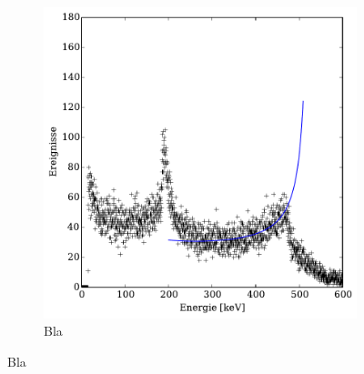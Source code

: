 \begin{figure}[htb]
\begin{subfigure}{0.49\linewidth}
        \includegraphics[width=1.0\linewidth]{img/06_caesium_zoomed.pdf}
        \caption{
            Bla
        }
        \label{fig:cs_spektrum_zoom}
    \end{subfigure}
\end{figure}

